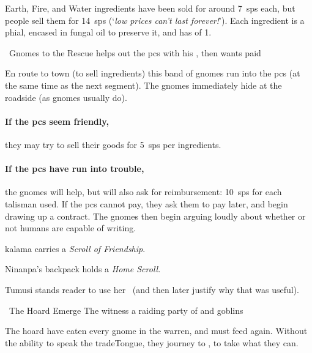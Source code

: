 Earth, Fire, and Water \glspl{ingredient} have been sold for around 7~\glspl{sp} each, but people sell them for 14~\glspl{sp} (`\textit{low prices can't last forever!}').
Each \gls{ingredient} is a phial, encased in fungal oil to preserve it, and has  of 1.

{\squash~Gnomes to the Rescue}%
{ helps out the \glspl{pc} with his , then wants paid}%

En route to town (to sell \glspl{ingredient}) this band of gnomes run into the \glspl{pc} (at the same time as the next \gls{segment}).
The gnomes immediately hide at the roadside (as gnomes usually do).

\paragraph{If the \glspl{pc} seem friendly,}
they may try to sell their goods for 5~\glspl{sp} per \glspl{ingredient}.

\paragraph{If the \glspl{pc} have run into trouble,}
the gnomes will help, but will also ask for reimbursement: 10~\glspl{sp} for each \gls{talisman} used.
If the \glspl{pc} cannot pay, they ask them to pay later, and begin drawing up a contract.
The gnomes then begin arguing loudly about whether or not humans are capable of writing.


\Gls{kalama} carries a \textit{Scroll of Friendship}.

\scrollOfFriendship


Ninanpa's backpack holds a \textit{Home Scroll}.

\homeScroll


Tumusi stands reader to use her \lootTalisman\ (and then later justify why that was useful).

\showTalisman

{~The Hoard Emerge}%
{The  witness a raiding party of  and goblins}%

\begin{exampletext}
  The hoard have eaten every gnome in the \gls{warren}, and must feed again.
  Without the ability to speak the \gls{tradeTongue}, they journey to , to take what they can.
\end{exampletext}

